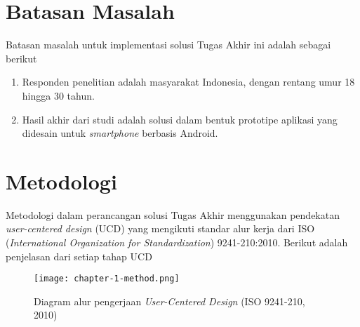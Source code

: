 \section{Batasan Masalah}

Batasan masalah untuk implementasi solusi Tugas Akhir ini adalah sebagai berikut
\begin{enumerate}
  \item Responden penelitian adalah masyarakat Indonesia, dengan rentang umur 18 hingga 30 tahun.
  \item Hasil akhir dari studi adalah solusi dalam bentuk prototipe aplikasi yang didesain untuk \textit{smartphone} berbasis Android.
\end{enumerate}

\section{Metodologi}
\label{sec:metodologi}

Metodologi dalam perancangan solusi Tugas Akhir menggunakan pendekatan \textit{user-centered design} (UCD) yang mengikuti standar alur kerja dari ISO (\textit{International Organization for Standardization}) 9241-210:2010. Berikut adalah penjelasan dari setiap tahap UCD


\begin{figure}[h]
  \centering
  \texttt{[image: chapter-1-method.png]}
  \caption{Diagram alur pengerjaan \textit{User-Centered Design} (ISO 9241-210, 2010)}
  \label{fig:diagram_iso1}
\end{figure}

